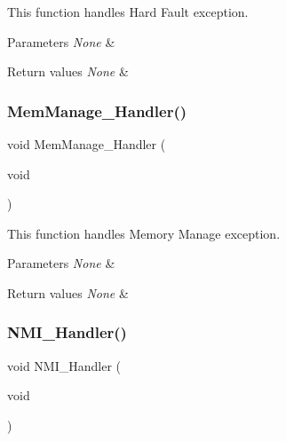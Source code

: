 This function handles Hard Fault exception. 


\begin{DoxyParams}{Parameters}
{\em None} & \\
\hline
\end{DoxyParams}

\begin{DoxyRetVals}{Return values}
{\em None} & \\
\hline
\end{DoxyRetVals}
\mbox{\label{group___template___project_ga3150f74512510287a942624aa9b44cc5}} 
\subsubsection{\texorpdfstring{Mem\+Manage\+\_\+\+Handler()}{MemManage\_Handler()}}
{\footnotesize\ttfamily void Mem\+Manage\+\_\+\+Handler (\begin{DoxyParamCaption}\item[{void}]{ }\end{DoxyParamCaption})}



This function handles Memory Manage exception. 


\begin{DoxyParams}{Parameters}
{\em None} & \\
\hline
\end{DoxyParams}

\begin{DoxyRetVals}{Return values}
{\em None} & \\
\hline
\end{DoxyRetVals}
\mbox{\label{group___template___project_ga6ad7a5e3ee69cb6db6a6b9111ba898bc}} 
\subsubsection{\texorpdfstring{N\+M\+I\+\_\+\+Handler()}{NMI\_Handler()}}
{\footnotesize\ttfamily void N\+M\+I\+\_\+\+Handler (\begin{DoxyParamCaption}\item[{void}]{ }\end{DoxyParamCaption})}



